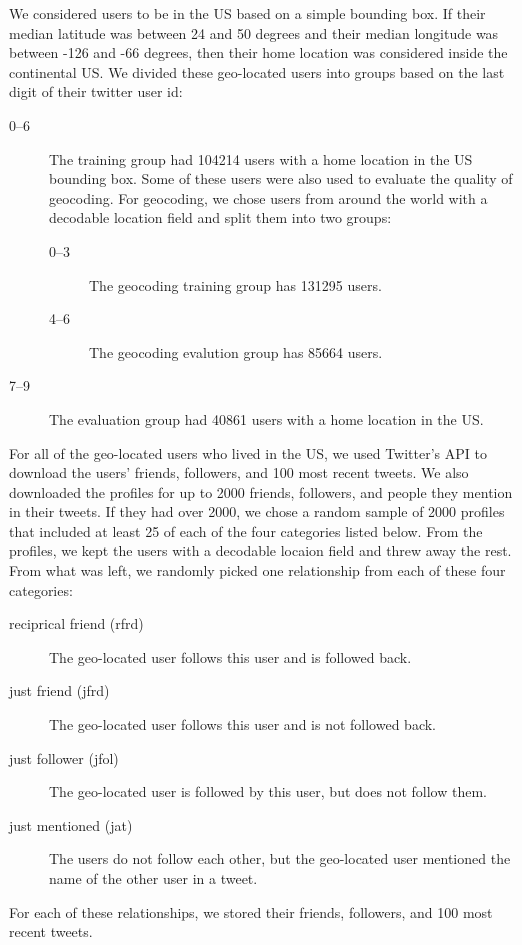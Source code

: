 \documentclass{sig-alternate}
\begin{document}
We considered users to be in the US based on a simple bounding box.  If their median latitude was between 24 and 50 degrees and their median longitude was between -126 and -66 degrees, then their home location was considered inside the continental US.
We divided these geo-located users into groups based on the last digit of their twitter user id:
\begin{description}
\item[0--6] The training group had 104214 users with a home location in the US bounding box. Some of these users were also used to evaluate the quality of geocoding. For geocoding, we chose users from around the world with a decodable location field and split them into two groups:
\begin{description}
\item[0--3] The geocoding training group has 131295 users.
\item[4--6] The geocoding evalution group has 85664 users.
\end{description}
\item[7--9] The evaluation group had 40861 users with a home location in the US.
\end{description}

For all of the geo-located users who lived in the US, we used Twitter's API to download the users' friends, followers, and 100 most recent tweets.
We also downloaded the profiles for up to 2000 friends, followers, and people they mention in their tweets. If they had over 2000, we chose a random sample of 2000 profiles that included at least 25 of each of the four categories listed below.
From the profiles, we kept the users with a decodable locaion field and threw away the rest. From what was left, we randomly picked one relationship from each of these four categories:
\begin{description}
\item[reciprical friend (rfrd)] The geo-located user follows this user and is followed back.
\item[just friend (jfrd)] The geo-located user follows this user and is not followed back.
\item[just follower (jfol)]The geo-located user is followed by this user, but does not follow them.
\item[just mentioned (jat)] The users do not follow each other, but the geo-located user mentioned the name of the other user in a tweet.
\end{description}
For each of these relationships, we stored their friends, followers, and 100 most recent tweets.
\end{document}
